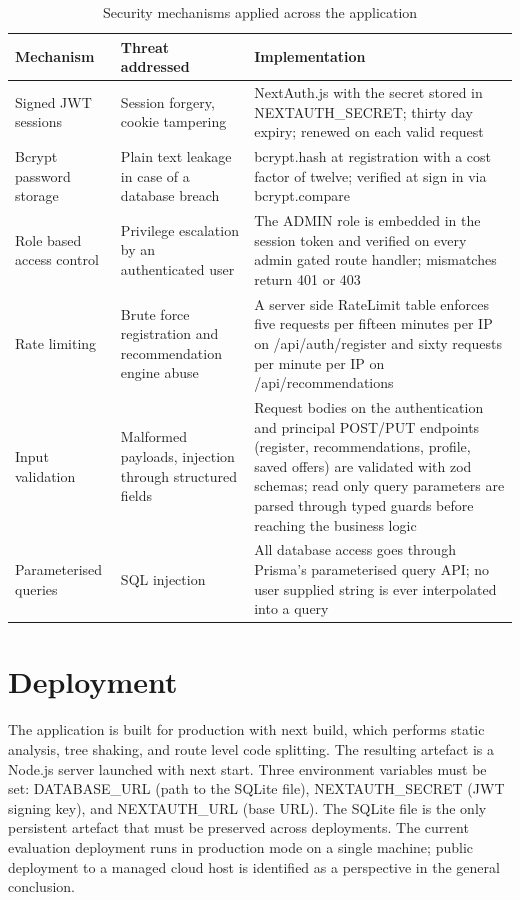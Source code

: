 \begin{table}[H]
  \caption{Security mechanisms applied across the application}
  \label{tab:security}
  \centering\small
  \begin{tabular}{|p{3.0cm}|p{3.8cm}|p{6.0cm}|}
    \hline
    \textbf{Mechanism} & \textbf{Threat addressed} & \textbf{Implementation} \\
    \hline
    Signed JWT sessions       & Session forgery, cookie tampering & NextAuth.js with the secret stored in NEXTAUTH\_SECRET; thirty day expiry; renewed on each valid request \\
    \hline
    Bcrypt password storage   & Plain text leakage in case of a database breach & bcrypt.hash at registration with a cost factor of twelve; verified at sign in via bcrypt.compare \\
    \hline
    Role based access control & Privilege escalation by an authenticated user & The ADMIN role is embedded in the session token and verified on every admin gated route handler; mismatches return 401 or 403 \\
    \hline
    Rate limiting             & Brute force registration and recommendation engine abuse & A server side RateLimit table enforces five requests per fifteen minutes per IP on /api/auth/register and sixty requests per minute per IP on /api/recommendations \\
    \hline
    Input validation          & Malformed payloads, injection through structured fields & Request bodies on the authentication and principal POST/PUT endpoints (register, recommendations, profile, saved offers) are validated with zod schemas; read only query parameters are parsed through typed guards before reaching the business logic \\
    \hline
    Parameterised queries     & SQL injection & All database access goes through Prisma's parameterised query API; no user supplied string is ever interpolated into a query \\
    \hline
  \end{tabular}
\end{table}

\section{Deployment}

{\sloppy The application is built for production with next build, which performs static analysis, tree shaking, and route level code splitting. The resulting artefact is a Node.js server launched with next start. Three environment variables must be set: DATABASE\_URL (path to the SQLite file), NEXTAUTH\_SECRET (JWT signing key), and NEXTAUTH\_URL (base URL). The SQLite file is the only persistent artefact that must be preserved across deployments. The current evaluation deployment runs in production mode on a single machine; public deployment to a managed cloud host is identified as a perspective in the general conclusion.\par}

